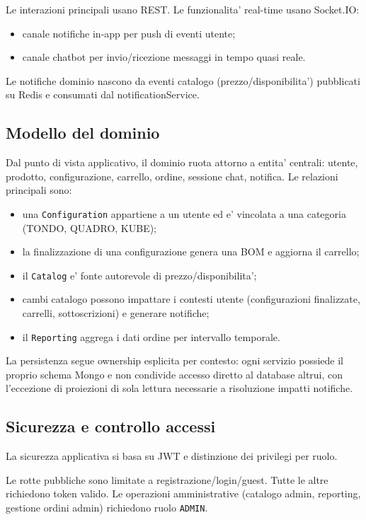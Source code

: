Le interazioni principali usano REST. Le funzionalita' real-time usano Socket.IO:

\begin{itemize}
	\item canale notifiche in-app per push di eventi utente;
	\item canale chatbot per invio/ricezione messaggi in tempo quasi reale.
\end{itemize}

Le notifiche dominio nascono da eventi catalogo (prezzo/disponibilita') pubblicati su Redis e consumati dal notificationService.

\subsection{Modello del dominio}

Dal punto di vista applicativo, il dominio ruota attorno a entita' centrali: utente, prodotto, configurazione, carrello, ordine, sessione chat, notifica. Le relazioni principali sono:

\begin{itemize}
	\item una \texttt{Configuration} appartiene a un utente ed e' vincolata a una categoria (TONDO, QUADRO, KUBE);
	\item la finalizzazione di una configurazione genera una BOM e aggiorna il carrello;
	\item il \texttt{Catalog} e' fonte autorevole di prezzo/disponibilita';
	\item cambi catalogo possono impattare i contesti utente (configurazioni finalizzate, carrelli, sottoscrizioni) e generare notifiche;
	\item il \texttt{Reporting} aggrega i dati ordine per intervallo temporale.
\end{itemize}

La persistenza segue ownership esplicita per contesto: ogni servizio possiede il proprio schema Mongo e non condivide accesso diretto al database altrui, con l'eccezione di proiezioni di sola lettura necessarie a risoluzione impatti notifiche.

\subsection{Sicurezza e controllo accessi}

La sicurezza applicativa si basa su JWT e distinzione dei privilegi per ruolo.

Le rotte pubbliche sono limitate a registrazione/login/guest. Tutte le altre richiedono token valido. Le operazioni amministrative (catalogo admin, reporting, gestione ordini admin) richiedono ruolo \texttt{ADMIN}.

